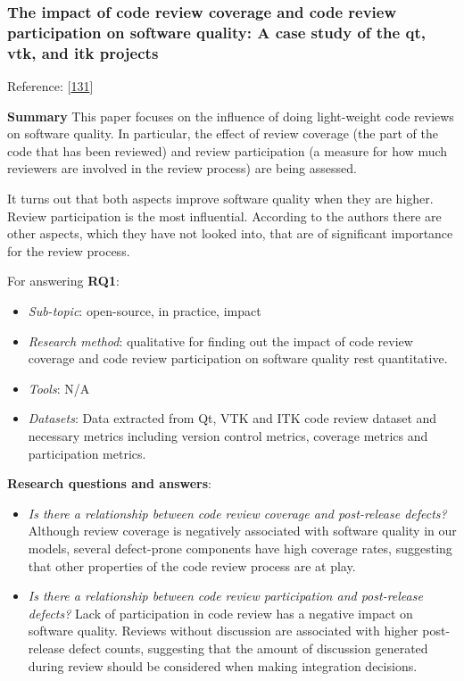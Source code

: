 \documentclass[]{book}
\providecommand{\tightlist}{%
  \setlength{\itemsep}{0pt}\setlength{\parskip}{0pt}}
\begin{document}
\subsubsection{The impact of code review coverage and code review
participation on software quality: A case study of the qt, vtk, and itk
projects}\label{the-impact-of-code-review-coverage-and-code-review-participation-on-software-quality-a-case-study-of-the-qt-vtk-and-itk-projects}

Reference: {[}\protect\hyperlink{ref-mcintosh2014impact}{131}{]}

\textbf{Summary} This paper focuses on the influence of doing
light-weight code reviews on software quality. In particular, the effect
of review coverage (the part of the code that has been reviewed) and
review participation (a measure for how much reviewers are involved in
the review process) are being assessed.

It turns out that both aspects improve software quality when they are
higher. Review participation is the most influential. According to the
authors there are other aspects, which they have not looked into, that
are of significant importance for the review process.

For answering \textbf{RQ1}:

\begin{itemize}
\tightlist
\item
  \emph{Sub-topic}: open-source, in practice, impact
\item
  \emph{Research method}: qualitative for finding out the impact of code
  review coverage and code review participation on software quality rest
  quantitative.
\item
  \emph{Tools}: N/A
\item
  \emph{Datasets}: Data extracted from Qt, VTK and ITK code review
  dataset and necessary metrics including version control metrics,
  coverage metrics and participation metrics.
\end{itemize}

\textbf{Research questions and answers}:

\begin{itemize}
\item
  \emph{Is there a relationship between code review coverage and
  post-release defects?} Although review coverage is negatively
  associated with software quality in our models, several defect-prone
  components have high coverage rates, suggesting that other properties
  of the code review process are at play.
\item
  \emph{Is there a relationship between code review participation and
  post-release defects?} Lack of participation in code review has a
  negative impact on software quality. Reviews without discussion are
  associated with higher post-release defect counts, suggesting that the
  amount of discussion generated during review should be considered when
  making integration decisions.
\end{itemize}
\end{document}
